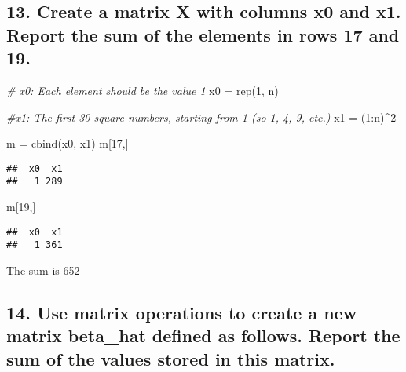 \documentclass[
]{article}
\newenvironment{Shaded}{\begin{snugshade}}{\end{snugshade}}
\newcommand{\CommentTok}[1]{\textcolor[rgb]{0.56,0.35,0.01}{\textit{#1}}}
\newcommand{\DecValTok}[1]{\textcolor[rgb]{0.00,0.00,0.81}{#1}}
\newcommand{\FunctionTok}[1]{\textcolor[rgb]{0.00,0.00,0.00}{#1}}
\newcommand{\NormalTok}[1]{#1}
\newcommand{\OtherTok}[1]{\textcolor[rgb]{0.56,0.35,0.01}{#1}}
\newcommand{\SpecialCharTok}[1]{\textcolor[rgb]{0.00,0.00,0.00}{#1}}
\begin{document}
\hypertarget{create-a-matrix-x-with-columns-x0-and-x1.-report-the-sum-of-the-elements-in-rows-17-and-19.}{%
\subsection{13. Create a matrix X with columns x0 and x1. Report the sum
of the elements in rows 17 and
19.}\label{create-a-matrix-x-with-columns-x0-and-x1.-report-the-sum-of-the-elements-in-rows-17-and-19.}}

\begin{Shaded}
\begin{Highlighting}[]
\CommentTok{\# x0: Each element should be the value 1 }
\NormalTok{x0 }\OtherTok{=} \FunctionTok{rep}\NormalTok{(}\DecValTok{1}\NormalTok{, n)}

\CommentTok{\#x1: The first 30 square numbers, starting from 1 (so 1, 4, 9, etc.) }
\NormalTok{x1 }\OtherTok{=}\NormalTok{ (}\DecValTok{1}\SpecialCharTok{:}\NormalTok{n)}\SpecialCharTok{\^{}}\DecValTok{2}

\NormalTok{m }\OtherTok{=} \FunctionTok{cbind}\NormalTok{(x0, x1)}
\NormalTok{m[}\DecValTok{17}\NormalTok{,]}
\end{Highlighting}
\end{Shaded}

\begin{verbatim}
##  x0  x1 
##   1 289
\end{verbatim}

\begin{Shaded}
\begin{Highlighting}[]
\NormalTok{m[}\DecValTok{19}\NormalTok{,]}
\end{Highlighting}
\end{Shaded}

\begin{verbatim}
##  x0  x1 
##   1 361
\end{verbatim}

The sum is 652

\hypertarget{use-matrix-operations-to-create-a-new-matrix-beta_hat-defined-as-follows.-report-the-sum-of-the-values-stored-in-this-matrix.}{%
\subsection{14. Use matrix operations to create a new matrix beta\_hat
defined as follows. Report the sum of the values stored in this
matrix.}\label{use-matrix-operations-to-create-a-new-matrix-beta_hat-defined-as-follows.-report-the-sum-of-the-values-stored-in-this-matrix.}}
\end{document}
